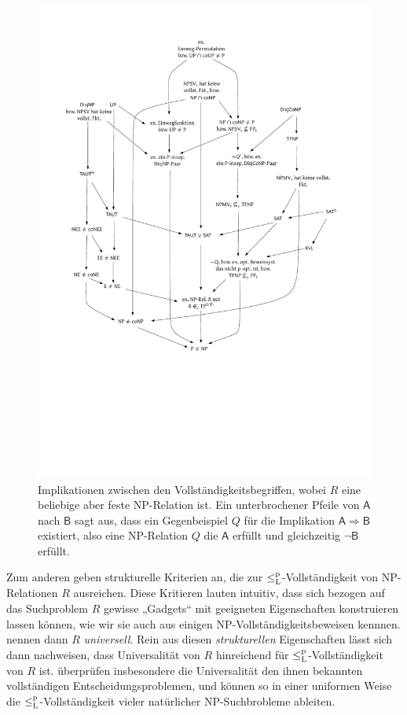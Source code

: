\begin{figure}[tb]
    \centering\includegraphics[page=2]{figures.pdf}
    \caption{Implikationen zwischen den  Vollständigkeitsbegriffen, wobei $R$ eine beliebige aber feste NP-Relation ist. Ein unterbrochener Pfeile von $\mathsf{A}$ nach $\mathsf{B}$ sagt aus, dass ein Gegenbeispiel $Q$ für die Implikation $\mathsf{A\Rightarrow B}$ existiert, also eine NP-Relation $Q$ die $\mathsf{A}$ erfüllt und gleichzeitig $\neg\mathsf{B}$ erfüllt.}\label{fig:reduktionsbegriffe}
    \forcerectofloat
\end{figure}

Zum anderen geben \textcite{agrawal_universal_1992} strukturelle Kriterien an, die zur $\leq_\mathrm{L}^\mathrm{p}$-Vollständigkeit von NP-Relationen $R$ ausreichen. Diese Kritieren lauten intuitiv, dass sich bezogen auf das Suchproblem $R$ gewisse „Gadgets“ mit geeigneten Eigenschaften konstruieren lassen können, wie wir sie auch aus einigen NP-Vollständigkeitsbeweisen kennnen. \citeauthor{agrawal_universal_1992} nennen dann $R$ \emph{universell}. 
Rein aus diesen \emph{strukturellen} Eigenschaften lässt sich dann nachweisen, dass Universalität von $R$ hinreichend für $\leq_\mathrm{L}^\mathrm{p}$-Vollständigkeit von $R$ ist. 
\textcite{agrawal_universal_1992} überprüfen insbesondere die Universalität den ihnen bekannten vollständigen Entscheidungsproblemen, und können so in einer uniformen Weise die $\leq_\mathrm{L}^\mathrm{p}$-Vollständigkeit vieler natürlicher NP-Suchbrobleme ableiten.

